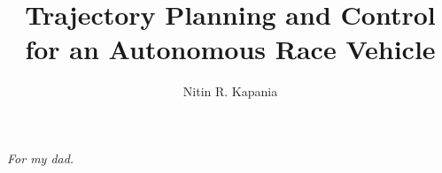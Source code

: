 \documentclass[12pt]{report}
\title{Trajectory Planning and Control for an Autonomous Race Vehicle}
\author{Nitin R. Kapania}
\begin{document}

\beforepreface

\begin{center}
\textit{For my dad.}
\end{center}




\afterpreface












%





\end{document}
